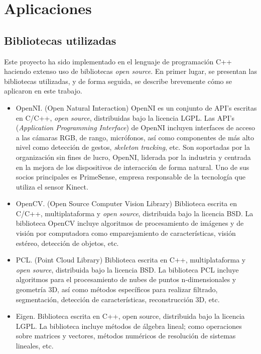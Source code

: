 
\chapter{Aplicaciones}

\section{Bibliotecas utilizadas}

Este proyecto ha sido implementado en el lenguaje de programación C++ \cite{cplusplus} haciendo extenso uso de bibliotecas \textit{open source}. En primer lugar, se presentan las bibliotecas utilizadas, y de forma seguida, se describe brevemente cómo se aplicaron en este trabajo.

\begin{itemize}

\item OpenNI. (Open Natural Interaction) OpenNI es un conjunto de API’s escritas en C/C++, \textit{open source}, distribuidas bajo la licencia LGPL. Las API's (\textit{Application Programming Interface}) de OpenNI incluyen interfaces de acceso a las cámaras RGB, de rango, micrófonos, así como componentes de más alto nivel como detección de gestos, \textit{skeleton tracking}, etc.
Son soportadas por la organización sin fines de lucro, OpenNI, liderada por la industria y centrada en la mejora de los dispositivos de interacción de forma natural. Uno de sus socios principales es PrimeSense, empresa responsable de la tecnología que utiliza el sensor Kinect. 

\item OpenCV. (Open Source Computer Vision Library) Biblioteca escrita en C/C++, multiplataforma y \textit{open source}, distribuida bajo la licencia BSD. La biblioteca OpenCV incluye algoritmos de procesamiento de imágenes y de visión por computadora como emparejamiento de características, visión estéreo, detección de objetos, etc.

\item PCL. (Point Cloud Library) Biblioteca escrita en C++, multiplataforma y \textit{open source}, distribuida bajo la licencia BSD. La biblioteca PCL incluye algoritmos para el procesamiento de nubes de puntos n-dimensionales y geometría 3D, así como métodos específicos para realizar filtrado, segmentación, detección de características, reconstrucción 3D, etc.

\item Eigen. Biblioteca escrita en C++, open source, distribuida bajo la licencia LGPL. La biblioteca incluye métodos de álgebra lineal; como operaciones sobre matrices y vectores, métodos numéricos de resolución de sistemas lineales, etc.


\end{itemize}
